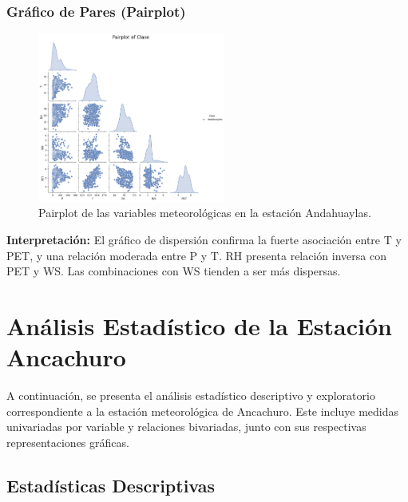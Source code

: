 \subsubsection*{Gráfico de Pares (Pairplot)}
\begin{figure}[H]
\centering
\includegraphics[width=0.55\textwidth]{resultados/por_estacion_meteorologica/Andahuaylas/pairplot.png}
\caption{Pairplot de las variables meteorológicas en la estación Andahuaylas.}
\label{fig:andahuaylas_pairplot}
\end{figure}
\textbf{Interpretación:} El gráfico de dispersión confirma la fuerte asociación entre T y PET, y una relación moderada entre P y T. RH presenta relación inversa con PET y WS. Las combinaciones con WS tienden a ser más dispersas.






\section{Análisis Estadístico de la Estación Ancachuro}

A continuación, se presenta el análisis estadístico descriptivo y exploratorio correspondiente a la estación meteorológica de Ancachuro. Este incluye medidas univariadas por variable y relaciones bivariadas, junto con sus respectivas representaciones gráficas.

\subsection{Estadísticas Descriptivas}

